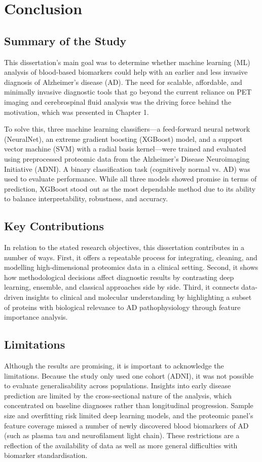 \documentclass[a4paper,12pt]{article}
\begin{document}
\newpage
\section{Conclusion}

\subsection{Summary of the Study}
This dissertation's main goal was to determine whether machine learning (ML) analysis of blood-based biomarkers could help with an earlier and less invasive diagnosis of Alzheimer's disease (AD).  The need for scalable, affordable, and minimally invasive diagnostic tools that go beyond the current reliance on PET imaging and cerebrospinal fluid analysis was the driving force behind the motivation, which was presented in Chapter 1.

To solve this, three machine learning classifiers—a feed-forward neural network (NeuralNet), an extreme gradient boosting (XGBoost) model, and a support vector machine (SVM) with a radial basis kernel—were trained and evaluated using preprocessed proteomic data from the Alzheimer's Disease Neuroimaging Initiative (ADNI).  A binary classification task (cognitively normal vs. AD) was used to evaluate performance.  While all three models showed promise in terms of prediction, XGBoost stood out as the most dependable method due to its ability to balance interpretability, robustness, and accuracy.  

\subsection{Key Contributions}
In relation to the stated research objectives, this dissertation contributes in a number of ways.  First, it offers a repeatable process for integrating, cleaning, and modelling high-dimensional proteomics data in a clinical setting.  Second, it shows how methodological decisions affect diagnostic results by contrasting deep learning, ensemble, and classical approaches side by side.  Third, it connects data-driven insights to clinical and molecular understanding by highlighting a subset of proteins with biological relevance to AD pathophysiology through feature importance analysis. 

\subsection{Limitations}
Although the results are promising, it is important to acknowledge the limitations.  Because the study only used one cohort (ADNI), it was not possible to evaluate generalisability across populations.  Insights into early disease prediction are limited by the cross-sectional nature of the analysis, which concentrated on baseline diagnoses rather than longitudinal progression.  Sample size and overfitting risk limited deep learning models, and the proteomic panel's feature coverage missed a number of newly discovered blood biomarkers of AD (such as plasma tau and neurofilament light chain).  These restrictions are a reflection of the availability of data as well as more general difficulties with biomarker standardisation.
\end{document}
